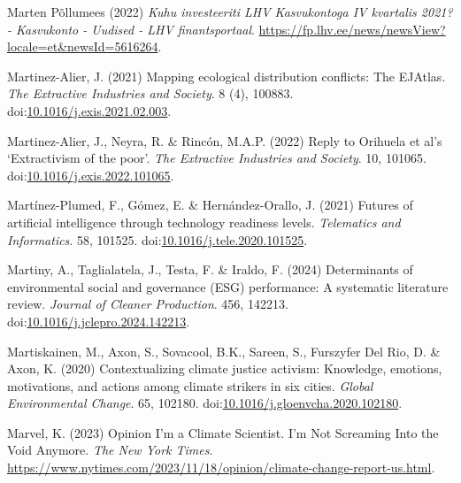 \documentclass[
  letterpaper,
  DIV=11,
  numbers=noendperiod]{scrartcl}
\newlength{\cslhangindent}
\newenvironment{CSLReferences}[2] %
 {\begin{list}{}{%
  \setlength{\itemindent}{0pt}
  \setlength{\leftmargin}{0pt}
  \setlength{\parsep}{0pt}
  \ifodd #1
   \setlength{\leftmargin}{\cslhangindent}
   \setlength{\itemindent}{-1\cslhangindent}
  \fi
  \setlength{\itemsep}{#2\baselineskip}}}
 {\end{list}}
\begin{document}
\begin{CSLReferences}{0}{1}
Marten Põllumees (2022) \emph{Kuhu investeeriti {LHV Kasvukontoga IV}
kvartalis 2021? - {Kasvukonto} - {Uudised} - {LHV} finantsportaal}.
\url{https://fp.lhv.ee/news/newsView?locale=et&newsId=5616264}.

Martinez-Alier, J. (2021) Mapping ecological distribution conflicts:
{The EJAtlas}. \emph{The Extractive Industries and Society}. 8 (4),
100883.
doi:\href{https://doi.org/10.1016/j.exis.2021.02.003}{10.1016/j.exis.2021.02.003}.

Martinez-Alier, J., Neyra, R. \& Rincón, M.A.P. (2022) Reply to
{Orihuela} et al's {`{Extractivism} of the poor'}. \emph{The Extractive
Industries and Society}. 10, 101065.
doi:\href{https://doi.org/10.1016/j.exis.2022.101065}{10.1016/j.exis.2022.101065}.

Martínez-Plumed, F., Gómez, E. \& Hernández-Orallo, J. (2021) Futures of
artificial intelligence through technology readiness levels.
\emph{Telematics and Informatics}. 58, 101525.
doi:\href{https://doi.org/10.1016/j.tele.2020.101525}{10.1016/j.tele.2020.101525}.

Martiny, A., Taglialatela, J., Testa, F. \& Iraldo, F. (2024)
Determinants of environmental social and governance ({ESG}) performance:
{A} systematic literature review. \emph{Journal of Cleaner Production}.
456, 142213.
doi:\href{https://doi.org/10.1016/j.jclepro.2024.142213}{10.1016/j.jclepro.2024.142213}.

Martiskainen, M., Axon, S., Sovacool, B.K., Sareen, S., Furszyfer Del
Rio, D. \& Axon, K. (2020) Contextualizing climate justice activism:
{Knowledge}, emotions, motivations, and actions among climate strikers
in six cities. \emph{Global Environmental Change}. 65, 102180.
doi:\href{https://doi.org/10.1016/j.gloenvcha.2020.102180}{10.1016/j.gloenvcha.2020.102180}.

Marvel, K. (2023) Opinion {\textbar} {I}'m a {Climate Scientist}. {I}'m
{Not Screaming Into} the {Void Anymore}. \emph{The New York Times}.
\url{https://www.nytimes.com/2023/11/18/opinion/climate-change-report-us.html}.


\end{CSLReferences}
\end{document}
